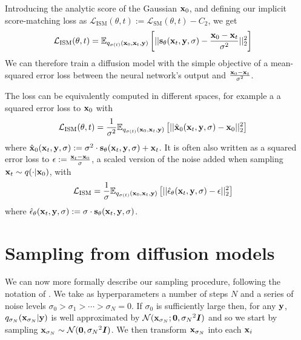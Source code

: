 Introducing the analytic score of the Gaussian ${\mathbf{x}}_0$, and defining our implicit score-matching loss as $\mathcal{L}_\text{ISM}(\theta, t) := \mathcal{L}_\text{SM}(\theta, t) - C_2$, we get
\begin{align}
    \mathcal{L}_\text{ISM}(\theta, t) &= \mathbb{E}_{q_{\sigma(t)}({\mathbf{x}}_0, {\mathbf{x}}_t, {\mathbf{y}})} \left[ 
    || {\mathbf{s}}_\theta({\mathbf{x}}_t, {\mathbf{y}}, \sigma) - \frac{{\mathbf{x}}_0-{\mathbf{x}}_t}{\sigma^2} ||_2^2 \right]
\end{align}
We can therefore train a diffusion model with the simple objective of a mean-squared error loss between the neural network's output and $\frac{{\mathbf{x}}_0-{\mathbf{x}}_t}{\sigma^2}$.

The loss can be equivalently computed in different spaces, for example a a squared error loss to ${\mathbf{x}}_0$ with
\begin{align}
    \mathcal{L}_\text{ISM}(\theta, t) &= \frac{1}{\sigma^2} \mathbb{E}_{q_{\sigma(t)}({\mathbf{x}}_0, {\mathbf{x}}_t, {\mathbf{y}})} \left[ 
    || \hat{{\mathbf{x}}}_0({\mathbf{x}}_t, {\mathbf{y}}, \sigma) - {\mathbf{x}}_0 ||_2^2 \right]
\end{align}
where $\hat{{\mathbf{x}}}_0({\mathbf{x}}_t, {\mathbf{y}}, \sigma) := \sigma^2 \cdot {\mathbf{s}}_\theta({\mathbf{x}}_t, {\mathbf{y}}, \sigma) + {\mathbf{x}}_t$. It is often also written as a squared error loss to $\epsilon := \frac{{\mathbf{x}}_t - {\mathbf{x}}_0}{\sigma}$, a scaled version of the noise added when sampling ${\mathbf{x}}_t \sim q(\cdot|{\mathbf{x}}_0)$, with
\begin{align}
    \mathcal{L}_\text{ISM} &= \frac{1}{\sigma} \mathbb{E}_{q_{\sigma(t)}({\mathbf{x}}_0, {\mathbf{x}}_t, {\mathbf{y}})} \left[ 
    || \hat{\mathbf{\epsilon}}_\theta({\mathbf{x}}_t, {\mathbf{y}}, \sigma) - \epsilon ||_2^2 \right]
\end{align}
where $\hat{\mathbf{\epsilon}}_\theta({\mathbf{x}}_t, {\mathbf{y}}, \sigma) := \sigma \cdot {\mathbf{s}}_\theta({\mathbf{x}}_t, {\mathbf{y}}, \sigma)$.


\section{Sampling from diffusion models}

We can now more formally describe our sampling procedure, following the notation of \citet{karras2022elucidating}. We take as hyperparameters a number of steps $N$ and a series of noise levels $\sigma_0 > \sigma_1 > \cdots > \sigma_N = 0$. If $\sigma_0$ is sufficiently large then, for any ${\mathbf{y}}$, $q_{\sigma_N}({\mathbf{x}}_{\sigma_N}|{\mathbf{y}}) $ is well approximated by ${\mathcal{N}}({\mathbf{x}}_{\sigma_N} ; {\bm{0}}, {\sigma_N}^2{\bm{I}})$ and so we start by sampling ${\mathbf{x}}_{\sigma_N} \sim {\mathcal{N}}({\bm{0}}, {\sigma_N}^2{\bm{I}})$. We then transform ${\mathbf{x}}_{\sigma_N}$ into each ${\mathbf{x}}_i$


